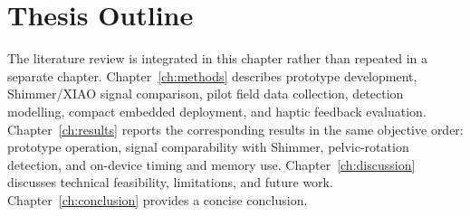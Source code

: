 \section{Thesis Outline}\label{sec:intro_outline}

The literature review is integrated in this chapter rather than repeated in a separate chapter. Chapter~\ref{ch:methods} describes prototype development, Shimmer/XIAO signal comparison, pilot field data collection, detection modelling, compact embedded deployment, and haptic feedback evaluation. Chapter~\ref{ch:results} reports the corresponding results in the same objective order: prototype operation, signal comparability with Shimmer, pelvic-rotation detection, and on-device timing and memory use. Chapter~\ref{ch:discussion} discusses technical feasibility, limitations, and future work. Chapter~\ref{ch:conclusion} provides a concise conclusion.
